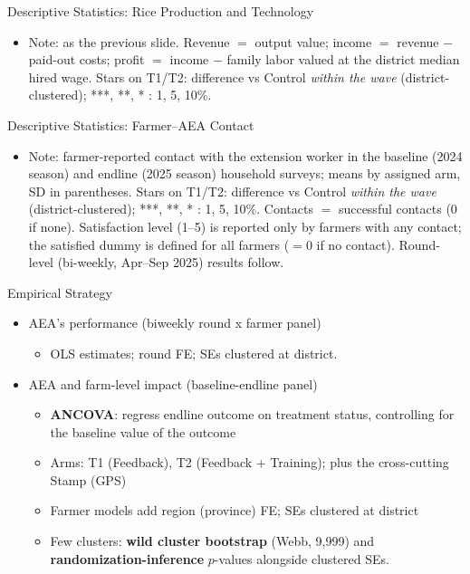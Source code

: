 \documentclass[aspectratio=169]{beamer}
\newcommand{\notefont}{\fontsize{5pt}{6pt}\selectfont}
\begin{document}
\begin{frame}{Descriptive Statistics: Rice Production and Technology}
	\centering
	\begin{itemize}\notefont
		\item Note: as the previous slide. Revenue $=$ output value; income $=$ revenue $-$
		paid-out costs; profit $=$ income $-$ family labor valued at the district median hired
		wage. Stars on T1/T2: difference vs Control \emph{within the wave} (district-clustered);
		***, **, * : 1, 5, 10\%.
	\end{itemize}
\end{frame}

\begin{frame}{Descriptive Statistics: Farmer--AEA Contact}
	\centering
	\begin{itemize}\notefont
		\item Note: farmer-reported contact with the extension worker in the baseline (2024
		season) and endline (2025 season) household surveys; means by assigned arm, SD in
		parentheses. Stars on T1/T2: difference vs Control \emph{within the wave}
		(district-clustered); ***, **, * : 1, 5, 10\%. Contacts $=$ successful contacts
		($0$ if none). Satisfaction level (1--5) is reported only by farmers with any
		contact; the satisfied dummy is defined for all farmers ($=0$ if no contact).
		Round-level (bi-weekly, Apr--Sep 2025) results follow.
	\end{itemize}
\end{frame}

\begin{frame}{Empirical Strategy}
    \begin{itemize}
    \item AEA's performance (biweekly round x farmer panel)
    \begin{itemize}
        \item OLS estimates; round FE; SEs clustered at district.
    \end{itemize}
			\vspace{0.3cm}
    \item AEA and farm-level impact (baseline-endline panel)
    \begin{itemize}
    	\item \textbf{ANCOVA}: regress endline outcome on treatment status, controlling for the baseline value of the outcome
	    \item Arms: T1 (Feedback), T2 (Feedback + Training); plus the cross-cutting Stamp (GPS)
	   \item Farmer models add region (province) FE; SEs clustered at district
       \item Few clusters: \textbf{wild cluster bootstrap} (Webb, 9{,}999) and \textbf{randomization-inference} $p$-values alongside clustered SEs.
    \end{itemize}
\end{itemize}


\end{frame}
\end{document}

